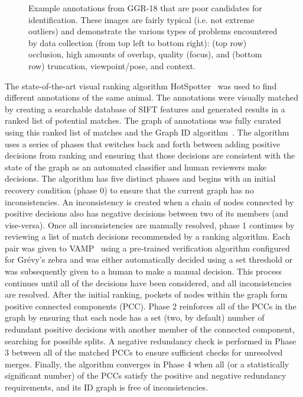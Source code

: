\begin{figure}[!t]
\begin{center}
    \end{center}
    \caption{Example annotations from GGR-18 that are poor candidates for identification.  These images are fairly typical (i.e. not extreme outliers) and demonstrate the various types of problems encountered by data collection (from top left to bottom right): (top row) occlusion, high amounts of overlap, quality (focus), and (bottom row) truncation, viewpoint/pose, and context.}
    \label{fig:ca-bad-examples}
\end{figure}

The state-of-the-art visual ranking algorithm HotSpotter~\cite{crall_hotspotter_2013} was used to find different annotations of the same animal.  The annotations were visually matched by creating a searchable database of SIFT features and generated results in a ranked list of potential matches. The graph of annotations was fully curated using this ranked list of matches and the Graph ID algorithm~\cite{crall_identifying_2017}.  The algorithm uses a series of phases that switches back and forth between adding positive decisions from ranking and ensuring that those decisions are consistent with the state of the graph as an automated classifier and human reviewers make decisions.  The algorithm has five distinct phases and begins with an initial recovery condition (phase 0) to ensure that the current graph has no inconsistencies.  An inconsistency is created when a chain of nodes connected by positive decisions also has negative decisions between two of its members (and vise-versa).  Once all inconsistencies are manually resolved, phase 1 continues by reviewing a list of match decisions recommended by a ranking algorithm.  Each pair was given to VAMP~\cite{crall_identifying_2017} using a pre-trained verification algorithm configured for Gr\'evy's zebra and was either automatically decided using a set threshold or was subsequently given to a human to make a manual decision.  This process continues until all of the decisions have been considered, and all inconsistencies are resolved.  After the initial ranking, pockets of nodes within the graph form positive connected components (PCC).  Phase 2 reinforces all of the PCCs in the graph by ensuring that each node has a set (two, by default) number of redundant positive decisions with another member of the connected component, searching for possible splits.  A negative redundancy check is performed in Phase 3 between all of the matched PCCs to ensure sufficient checks for unresolved merges. Finally, the algorithm converges in Phase 4 when all (or a statistically significant number) of the PCCs satisfy the positive and negative redundancy requirements, and its ID graph is free of inconsistencies.

